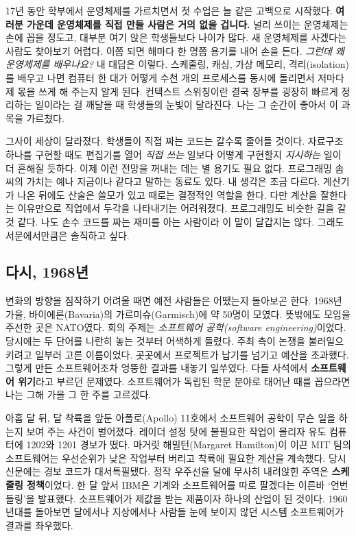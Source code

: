 
17년 동안 학부에서 운영체제를 가르치면서 첫 수업은 늘 같은 고백으로 시작했다. \textbf{여러분 가운데 운영체제를 직접 만들 사람은 거의 없을 겁니다.} 널리 쓰이는 운영체제는 손에 꼽을 정도고, 대부분 여기 앉은 학생들보다 나이가 많다. 새 운영체제를 사겠다는 사람도 찾아보기 어렵다. 이쯤 되면 해마다 한 명쯤 용기를 내어 손을 든다. \textit{그런데 왜 운영체제를 배우나요?} 내 대답은 이렇다. 스케줄링, 캐싱, 가상 메모리, 격리(isolation)를 배우고 나면 컴퓨터 한 대가 어떻게 수천 개의 프로세스를 동시에 돌리면서 저마다 제 몫을 쓰게 해 주는지 알게 된다. 컨텍스트 스위칭이란 결국 장부를 굉장히 빠르게 정리하는 일이라는 걸 깨달을 때 학생들의 눈빛이 달라진다. 나는 그 순간이 좋아서 이 과목을 가르쳤다.

그사이 세상이 달라졌다. 학생들이 직접 짜는 코드는 갈수록 줄어들 것이다. 자료구조 하나를 구현할 때도 편집기를 열어 \textit{직접 쓰는} 일보다 어떻게 구현할지 \textit{지시하는} 일이 더 흔해질 듯하다. 이제 이런 전망을 꺼내는 데는 별 용기도 필요 없다. 프로그래밍 솜씨의 가치는 예나 지금이나 같다고 말하는 동료도 있다. 내 생각은 조금 다르다. 계산기가 나온 뒤에도 산술은 쓸모가 있고 때로는 결정적인 역할을 한다. 다만 계산을 잘한다는 이유만으로 직업에서 두각을 나타내기는 어려워졌다. 프로그래밍도 비슷한 길을 갈 것 같다. 나도 손수 코드를 짜는 재미를 아는 사람이라 이 말이 달갑지는 않다. 그래도 서문에서만큼은 솔직하고 싶다.

\subsection*{다시, 1968년}

변화의 방향을 짐작하기 어려울 때면 예전 사람들은 어땠는지 돌아보곤 한다. 1968년 가을, 바이에른(Bavaria)의 가르미슈(Garmisch)에 약 50명이 모였다. 뜻밖에도 모임을 주선한 곳은 NATO였다. 회의 주제는 \textit{소프트웨어 공학(software engineering)}이었다. 당시에는 두 단어를 나란히 놓는 것부터 어색하게 들렸다. 주최 측이 논쟁을 불러일으키려고 일부러 고른 이름이었다. 곳곳에서 프로젝트가 납기를 넘기고 예산을 초과했다. 그렇게 만든 소프트웨어조차 엉뚱한 결과를 내놓기 일쑤였다. 다들 사석에서 \textbf{소프트웨어 위기}라고 부르던 문제였다. 소프트웨어가 독립된 학문 분야로 태어난 때를 꼽으라면 나는 그해 가을 그 한 주를 고르겠다.

아홉 달 뒤, 달 착륙을 앞둔 아폴로(Apollo) 11호에서 소프트웨어 공학이 무슨 일을 하는지 보여 주는 사건이 벌어졌다. 레이더 설정 탓에 불필요한 작업이 몰리자 유도 컴퓨터에 1202와 1201 경보가 떴다. 마거릿 해밀턴(Margaret Hamilton)이 이끈 MIT 팀의 소프트웨어는 우선순위가 낮은 작업부터 버리고 착륙에 필요한 계산을 계속했다. 당시 신문에는 경보 코드가 대서특필됐다. 정작 우주선을 달에 무사히 내려앉힌 주역은 \textbf{스케줄링 정책}이었다. 한 달 앞서 IBM은 기계와 소프트웨어를 따로 팔겠다는 이른바 ‘언번들링’을 발표했다. 소프트웨어가 제값을 받는 제품이자 하나의 산업이 된 것이다. 1960년대를 돌아보면 달에서나 지상에서나 사람들 눈에 보이지 않던 시스템 소프트웨어가 결과를 좌우했다.

